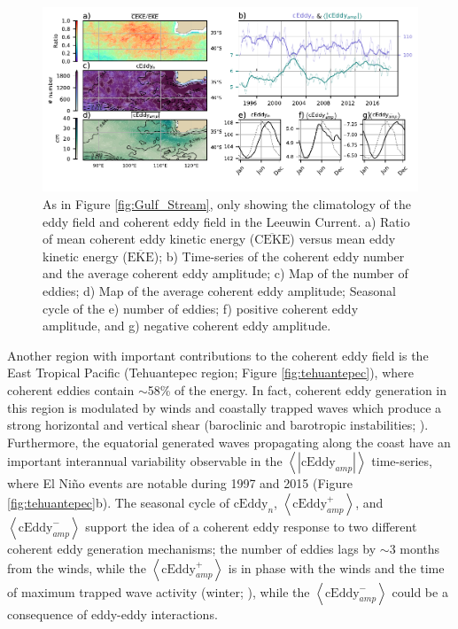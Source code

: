 \documentclass[draft,linenumbers]{agujournal2019}
\newcommand{\MEKE}{\overline{\textrm{EKE}}}
\newcommand{\MCEKE}{\overline{\textrm{CEKE}}}
\newcommand{\cEddy}{\textrm{cEddy}}
\begin{document}
	
	\begin{figure}
	    \centering
	    \includegraphics[width=1\textwidth]{./figures/regional_ratios_and_stats_V3_0.pdf}
	    \caption{As in Figure \ref{fig:Gulf_Stream}, only showing the  climatology of the eddy field and coherent eddy field in the Leeuwin Current. a) Ratio of mean coherent eddy kinetic energy ($\MCEKE$) versus mean eddy kinetic energy ($\MEKE$); b) Time-series of the coherent eddy number and the average coherent eddy amplitude; c) Map of the number of eddies; d) Map of the average coherent eddy amplitude; Seasonal cycle of the e) number of eddies; f) positive coherent eddy amplitude, and g) negative coherent eddy amplitude.}
	    \label{fig:leeuwin_cycle}
	\end{figure}

	Another region with important contributions to the coherent eddy field is the East Tropical Pacific (Tehuantepec region; Figure \ref{fig:tehuantepec}), where coherent eddies contain $\sim$58\% of the energy. 
	In fact, coherent eddy generation in this region is modulated by winds and coastally trapped waves which produce a strong horizontal and vertical shear (baroclinic and barotropic instabilities; \citealp{Zamudio_Tehuantepec_2006}). 
	Furthermore, the equatorial generated waves propagating along the coast have an important interannual variability observable in the $\left<|\cEddy_{amp}|\right>$ time-series, where El Niño events are notable during 1997 and 2015 (Figure \ref{fig:tehuantepec}b). 
	The seasonal cycle of $\cEddy_{n}$, $\left<\cEddy_{amp}^+\right>$, and $\left<\cEddy_{amp}^-\right>$ support the idea of a coherent eddy response to two different coherent eddy generation mechanisms; the number of eddies lags by $\sim$3 months from the winds, while the $\left<\cEddy_{amp}^+\right>$ is in phase with the winds and the time of maximum trapped wave activity (winter; \citealp{Zamudio_Tehuantepec_2006}), while the $\left<\cEddy_{amp}^-\right>$ could be a consequence of eddy-eddy interactions. 
\end{document}
